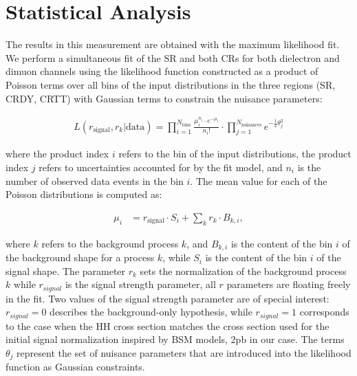 \section{Statistical Analysis}
\label{sec:statistics}


The results in this measurement are obtained with the maximum likelihood fit. We perform a simultaneous fit of the SR and both CRs for both dielectron and dimuon channels using the likelihood function constructed as a product
of Poisson terms over all bins of the input \mTHH distributions in the three regions (SR, CRDY, CRTT) with Gaussian terms to constrain the nuisance parameters:

\begin{align*}
 L(r_{\text{signal}}, r_{k}|\text{data}) = \prod_{i=1}^{N_{\mathrm{bins}}}\frac{\mu_{i}^{n_{i}}\cdot e^{-\mu_{i}}}{n_{i}!}
\cdot \prod_{j=1}^{N_{\mathrm{nuisances}}} e^{-\frac{1}{2}\theta_{j}^{2}}
\end{align*}

\noindent where the product index $i$ refers to the bin of the input distributions, the product index $j$
refers to uncertainties accounted for by the fit model, and $n_i$ is the number of observed data
events in the bin $i$. The mean value for each of the Poisson distributions is computed as:


\begin{align*}
\mu_{i} &= r_{\text{signal}} \cdot S_{i} + \sum_{k}r_{k}\cdot B_{k,i},
\end{align*}


\noindent where $k$ refers to the background process $k$, and $B_{k,i}$ is the content of the bin $i$ of the background
shape for a process $k$, while $S_i$ is the content of the bin $i$ of the signal shape. The parameter $r_k$
sets the normalization of the background process $k$ while $r_{signal}$ is the signal strength parameter, all $r$ parameters are floating freely in the fit.
Two values of the signal strength parameter are of special interest:  $r_{signal} = 0$ describes the
background-only hypothesis, while $r_{signal} = 1$ corresponds to the case when the HH cross section
matches the cross section used for the initial signal normalization inspired by BSM models, 2pb in our case. 
The terms $\theta_j$ represent the set of nuisance parameters that are introduced into the likelihood
function as Gaussian constraints. 


